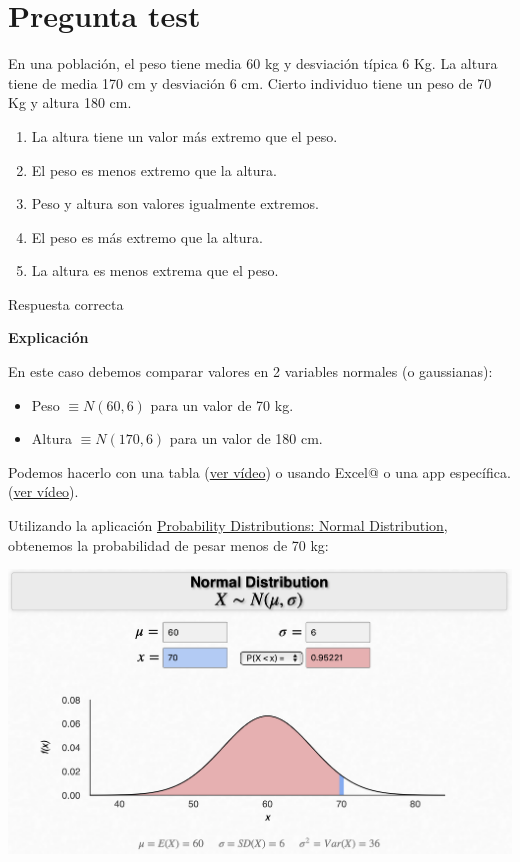 \documentclass[
]{book}
\providecommand{\tightlist}{%
  \setlength{\itemsep}{0pt}\setlength{\parskip}{0pt}}
\begin{document}
\hypertarget{pregunta-test-108}{%
\section{Pregunta test}\label{pregunta-test-108}}

En una población, el peso tiene media 60 kg y desviación típica 6 Kg. La altura tiene de media 170 cm y desviación 6 cm. Cierto individuo tiene un peso de 70 Kg y altura 180 cm.

\begin{enumerate}
\def\labelenumi{\alph{enumi})}
\tightlist
\item
  La altura tiene un valor más extremo que el peso.
\item
  El peso es menos extremo que la altura.
\item
  Peso y altura son valores igualmente extremos.
\item
  El peso es más extremo que la altura.
\item
  La altura es menos extrema que el peso.
\end{enumerate}

Respuesta correcta

\textbf{Explicación}

En este caso debemos comparar valores en 2 variables normales (o gaussianas):

\begin{itemize}
\tightlist
\item
  Peso \(\equiv N(60, 6)\) para un valor de 70 kg.
\item
  Altura \(\equiv N(170, 6)\) para un valor de 180 cm.
\end{itemize}

Podemos hacerlo con una tabla (\href{https://youtu.be/xCBUdpIUx18}{ver vídeo}) o usando Excel@ o una app específica. (\href{https://youtu.be/rxkPlU1Ud7c}{ver vídeo}).

Utilizando la aplicación \href{https://homepage.divms.uiowa.edu/~mbognar/applets/normal.html}{Probability Distributions: Normal Distribution}, obtenemos la probabilidad de pesar menos de 70 kg:

\includegraphics[width=20.78in]{img/3_1}
\end{document}

